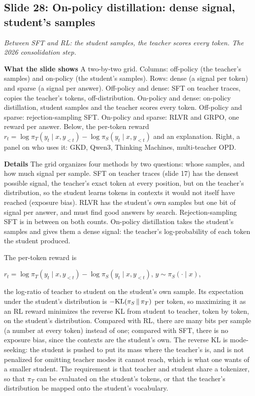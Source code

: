 \documentclass[11pt,letterpaper]{article}
\newcommand{\slide}[3]{%
  \subsection[Slide #1: #2]{Slide #1: #2}%
  {\color{muted}\itshape #3\par}\medskip}
\newcommand{\para}[1]{\medskip\noindent\textbf{#1}\quad}
\newenvironment{formulas}{\begin{tcolorbox}[formulabox]}{\end{tcolorbox}}
\begin{document}
\slide{28}{On-policy distillation: dense signal, student's samples}{Between SFT and RL: the student samples, the teacher scores every token. The 2026 consolidation step.}

\para{What the slide shows} A two-by-two grid. Columns: off-policy (the teacher's samples) and on-policy (the student's samples). Rows: dense (a signal per token) and sparse (a signal per answer). Off-policy and dense: SFT on teacher traces, copies the teacher's tokens, off-distribution. On-policy and dense: on-policy distillation, student samples and the teacher scores every token. Off-policy and sparse: rejection-sampling SFT. On-policy and sparse: RLVR and GRPO, one reward per answer. Below, the per-token reward $r_t=\log\pi_T(y_t\mid x,y_{<t})-\log\pi_S(y_t\mid x,y_{<t})$ and an explanation. Right, a panel on who uses it: GKD, Qwen3, Thinking Machines, multi-teacher OPD.

\para{Details} The grid organizes four methods by two questions: whose samples, and how much signal per sample. SFT on teacher traces (slide 17) has the densest possible signal, the teacher's exact token at every position, but on the teacher's distribution, so the student learns tokens in contexts it would not itself have reached (exposure bias). RLVR has the student's own samples but one bit of signal per answer, and must find good answers by search. Rejection-sampling SFT is in between on both counts. On-policy distillation takes the student's samples and gives them a dense signal: the teacher's log-probability of each token the student produced.

The per-token reward is
\begin{formulas}
$r_t=\log\pi_T(y_t\mid x,y_{<t})-\log\pi_S(y_t\mid x,y_{<t})$, \qquad $y\sim\pi_S(\cdot\mid x)$,
\end{formulas}
the log-ratio of teacher to student on the student's own sample. Its expectation under the student's distribution is $-\mathrm{KL}(\pi_S\,\|\,\pi_T)$ per token, so maximizing it as an RL reward minimizes the reverse KL from student to teacher, token by token, on the student's distribution. Compared with RL, there are many bits per sample (a number at every token) instead of one; compared with SFT, there is no exposure bias, since the contexts are the student's own. The reverse KL is mode-seeking: the student is pushed to put its mass where the teacher's is, and is not penalized for omitting teacher modes it cannot reach, which is what one wants of a smaller student. The requirement is that teacher and student share a tokenizer, so that $\pi_T$ can be evaluated on the student's tokens, or that the teacher's distribution be mapped onto the student's vocabulary.
\end{document}

